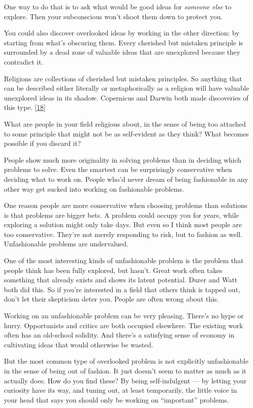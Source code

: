 One way to do that is to ask what would be good ideas for \emph{someone
else} to explore. Then your subconscious won't shoot them down to
protect you.

You could also discover overlooked ideas by working in the other
direction: by starting from what's obscuring them. Every cherished but
mistaken principle is surrounded by a dead zone of valuable ideas that
are unexplored because they contradict it.

Religions are collections of cherished but mistaken principles. So
anything that can be described either literally or metaphorically as a
religion will have valuable unexplored ideas in its shadow. Copernicus
and Darwin both made discoveries of this type. {[}\hyperref[f18n]{18}{]}

What are people in your field religious about, in the sense of being too
attached to some principle that might not be as self-evident as they
think? What becomes possible if you discard it?

People show much more originality in solving problems than in deciding
which problems to solve. Even the smartest can be surprisingly
conservative when deciding what to work on. People who'd never dream of
being fashionable in any other way get sucked into working on
fashionable problems.

One reason people are more conservative when choosing problems than
solutions is that problems are bigger bets. A problem could occupy you
for years, while exploring a solution might only take days. But even so
I think most people are too conservative. They're not merely responding
to risk, but to fashion as well. Unfashionable problems are undervalued.

One of the most interesting kinds of unfashionable problem is the
problem that people think has been fully explored, but hasn't. Great
work often takes something that already exists and shows its latent
potential. Durer and Watt both did this. So if you're interested in a
field that others think is tapped out, don't let their skepticism deter
you. People are often wrong about this.

Working on an unfashionable problem can be very pleasing. There's no
hype or hurry. Opportunists and critics are both occupied elsewhere. The
existing work often has an old-school solidity. And there's a satisfying
sense of economy in cultivating ideas that would otherwise be wasted.

But the most common type of overlooked problem is not explicitly
unfashionable in the sense of being out of fashion. It just doesn't seem
to matter as much as it actually does. How do you find these? By being
self-indulgent --- by letting your curiosity have its way, and tuning
out, at least temporarily, the little voice in your head that says you
should only be working on ``important'' problems.

